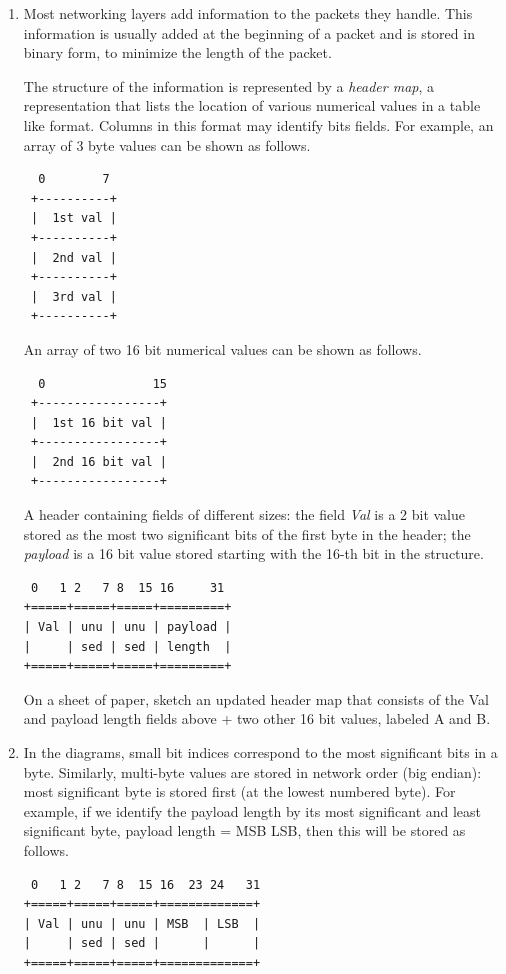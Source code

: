 \documentclass[12pt]{book}
\begin{document}
\begin{enumerate}[label=Activity \arabic*:]
\item Most networking layers add information to the packets they handle. This information is usually added at the beginning of a packet and is stored in binary form, to minimize the length of the packet.

  The structure of the information is represented by a \emph{header map}, a representation that lists the location of various numerical values in a table like format. Columns in this format may identify bits fields. For example, an array of 3 byte values can be shown as follows.

\begin{verbatim}
  0        7
 +----------+
 |  1st val |
 +----------+
 |  2nd val |
 +----------+
 |  3rd val |
 +----------+
\end{verbatim}

An array of two 16 bit numerical values can be shown as follows.
\begin{verbatim}
  0               15
 +-----------------+
 |  1st 16 bit val |
 +-----------------+
 |  2nd 16 bit val |
 +-----------------+
\end{verbatim}

A header containing fields of different sizes: the field \emph{Val} is a 2 bit value stored as the most two significant bits of the first byte in the header; the \emph{payload} is a 16 bit value stored starting with the 16-th bit in the structure.
\begin{verbatim}
 0   1 2   7 8  15 16     31
+=====+=====+=====+=========+
| Val | unu | unu | payload |
|     | sed | sed | length  |
+=====+=====+=====+=========+ 
\end{verbatim}

On a sheet of paper, sketch an updated header map that consists of the Val and payload length fields above + two other 16 bit values, labeled A and B.


\item In the diagrams, small bit indices correspond to the most significant bits in a byte. Similarly, multi-byte values are stored in network order (big endian): most significant byte is stored first (at the lowest numbered byte). For example, if we identify the payload length by its most significant and least significant byte, payload length = MSB LSB, then this will be stored as follows.
\begin{verbatim}
 0   1 2   7 8  15 16  23 24   31
+=====+=====+=====+=============+
| Val | unu | unu | MSB  | LSB  |
|     | sed | sed |      |      |
+=====+=====+=====+=============+ 
\end{verbatim}


\end{enumerate}
\end{document}
